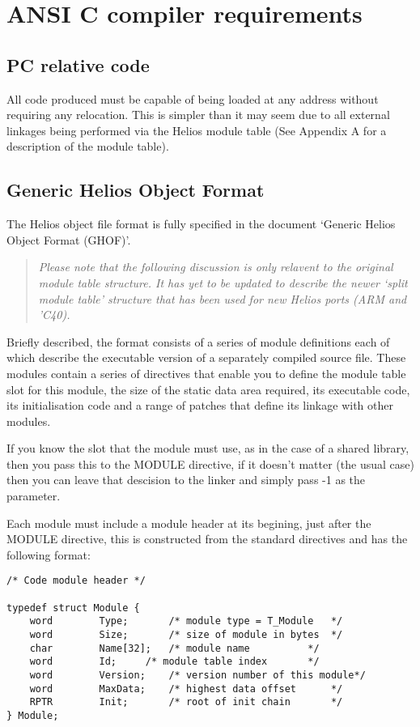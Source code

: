 \section{ANSI C compiler requirements}

\subsection{PC relative code}

All code produced must be capable of being loaded at any address without
requiring any relocation. This is simpler than it may seem due to all external
linkages being performed via the Helios module table (See Appendix A for
a description of the module table).

\subsection{Generic Helios Object Format}

The Helios object file format is fully specified in the document `Generic
Helios Object Format (GHOF)'.

\begin{quote}
\it
Please note that the following discussion is only relavent to the
original module table structure. It has yet to be updated to describe the
newer `split module table' structure that has been used for new Helios
ports (ARM and 'C40).
\rm
\end{quote}

Briefly described, the format
consists of a series of module definitions each of which describe the
executable version of a separately compiled source file.
These modules contain a series of directives that enable you to define the
module table slot for this module, the size of the static data area required,
its executable code, its initialisation code and a range of patches that
define its linkage with other modules.

If you know the slot that the module must use, as in the case of a shared
library, then you pass this to the MODULE directive, if it doesn't matter
(the usual case) then
you can leave that descision to the linker and simply pass -1 as the
parameter.
\begin{sloppypar}
Each module must include a module header at its begining, just after the
MODULE directive, this is constructed
from the standard directives and has the following format:
\end{sloppypar}

\scriptsize
\begin{verbatim}
/* Code module header */

typedef struct Module {
	word		Type;		/* module type = T_Module	*/
	word		Size;		/* size of module in bytes	*/
	char		Name[32];	/* module name			*/
	word		Id;		/* module table index		*/
	word		Version;	/* version number of this module*/
	word		MaxData;	/* highest data offset 		*/
	RPTR		Init;		/* root of init chain		*/
} Module;
\end{verbatim}
\normalsize

